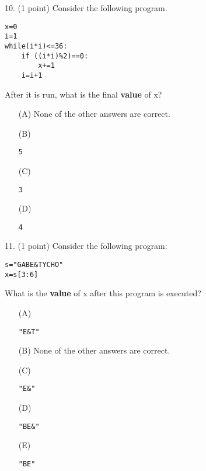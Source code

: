 \documentclass{article}
\begin{document}
\noindent
\begin{minipage}{\textwidth}
10. (1 point)
Consider the following program.
\begin{verbatim}
x=0
i=1
while(i*i)<=36:
    if ((i*i)%2)==0:
        x+=1
    i=i+1
\end{verbatim}
After it is run, what is the final \textbf{value} of x?

\begin{enumerate}
\item[(A)]
None of the other answers are correct.

\item[(B)]
\begin{verbatim}5\end{verbatim}

\item[(C)]
\begin{verbatim}3\end{verbatim}

\item[(D)]
\begin{verbatim}4\end{verbatim}

\end{enumerate}
\end{minipage}
\vspace{10em}
\filbreak\vfil{}\vfilneg

\noindent
\begin{minipage}{\textwidth}
11. (1 point)
Consider the following program:
\begin{verbatim}
s="GABE&TYCHO"
x=s[3:6]
\end{verbatim}
What is the \textbf{value} of x after this program is executed?

\begin{enumerate}
\item[(A)]
\begin{verbatim}"E&T"\end{verbatim}

\item[(B)]
None of the other answers are correct.

\item[(C)]
\begin{verbatim}"E&"\end{verbatim}

\item[(D)]
\begin{verbatim}"BE&"\end{verbatim}

\item[(E)]
\begin{verbatim}"BE"\end{verbatim}

\end{enumerate}
\end{minipage}
\vspace{10em}
\filbreak\vfil{}\vfilneg
\end{document}
